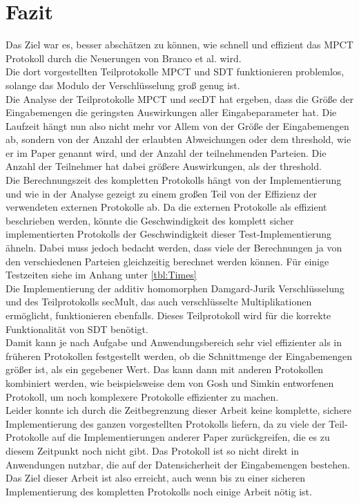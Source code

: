 \chapter{Fazit}

Das Ziel war es, besser abschätzen zu können, wie schnell und effizient das MPCT Protokoll durch die Neuerungen von Branco et al. \cite{Doettling2021} wird.\\
Die dort vorgestellten Teilprotokolle MPCT und SDT funktionieren problemlos, solange das Modulo der Verschlüsselung groß genug ist.\\
Die Analyse der Teilprotokolle MPCT und secDT hat ergeben, dass die Größe der Eingabemengen die geringsten Auswirkungen aller Eingabeparameter hat. Die Laufzeit hängt nun also nicht mehr vor Allem von der Größe der Eingabemengen ab, sondern  von der Anzahl der \glqq erlaubten Abweichungen\grqq{} oder dem \glqq threshold\grqq, wie er im Paper genannt wird, und der Anzahl der teilnehmenden Parteien. Die Anzahl der Teilnehmer hat dabei größere Auswirkungen, als der threshold.\\
Die Berechnungszeit des kompletten Protokolls hängt von der Implementierung und wie in der Analyse gezeigt zu einem großen Teil von der Effizienz der verwendeten externen Protokolle ab. Da die externen Protokolle als \glqq effizient\grqq{} beschrieben werden, könnte die Geschwindigkeit des komplett sicher implementierten Protokolls der Geschwindigkeit dieser Test-Implementierung ähneln. Dabei muss jedoch bedacht werden, dass viele der Berechnungen ja von den verschiedenen Parteien gleichzeitig berechnet werden können. Für einige Testzeiten siehe im Anhang unter \ref{tbl:Times}\\
Die Implementierung der additiv homomorphen Damgard-Jurik Verschlüsselung und des Teilprotokolls secMult, das auch verschlüsselte Multiplikationen ermöglicht, funktionieren ebenfalls. Dieses Teilprotokoll wird für die korrekte Funktionalität von SDT benötigt.\\
Damit kann je nach Aufgabe und Anwendungsbereich sehr viel effizienter als in früheren Protokollen festgestellt werden, ob die Schnittmenge der Eingabemengen größer ist, als ein gegebener Wert. Das kann dann mit anderen Protokollen kombiniert werden, wie beispielsweise dem von Gosh und Simkin \cite{Ghosh2019} entworfenen Protokoll, um noch komplexere Protokolle effizienter zu machen. \\
Leider konnte ich durch die Zeitbegrenzung dieser Arbeit keine komplette, sichere Implementierung des ganzen vorgestellten Protokolls liefern, da zu viele der Teil-Protokolle auf die Implementierungen anderer Paper zurückgreifen, die es zu diesem Zeitpunkt noch nicht gibt. Das Protokoll ist so nicht direkt in Anwendungen nutzbar, die auf der Datensicherheit der Eingabemengen bestehen.\\
Das Ziel dieser Arbeit ist also erreicht, auch wenn bis zu einer sicheren Implementierung des kompletten Protokolls noch einige Arbeit nötig ist.
